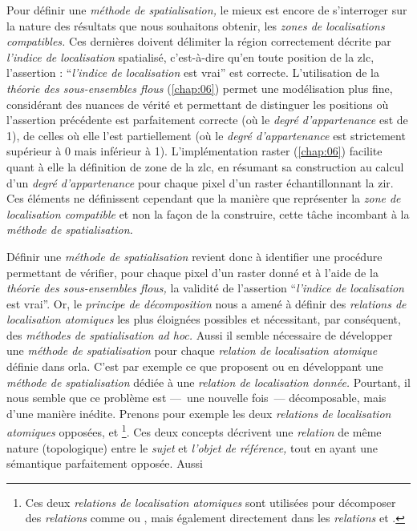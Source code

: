 Pour définir une \emph{méthode de spatialisation,} le mieux est encore de s’interroger sur la nature des résultats que nous souhaitons obtenir, les \emph{zones de localisations compatibles.} Ces dernières doivent délimiter la région correctement décrite par \emph{l'indice de localisation} spatialisé, c'est-à-dire qu'en toute position de la \ac{zlc}, l'assertion : \enquote{\emph{l'indice de localisation} est vrai} est correcte. L'utilisation de la \emph{théorie des sous-ensembles flous} (\autoref{chap:06}) permet une modélisation plus fine, considérant des nuances de vérité et permettant de distinguer les positions où l'assertion précédente est parfaitement correcte (\ie où le \emph{degré d'appartenance} est de 1), de celles où elle l'est partiellement (\ie où le \emph{degré d'appartenance} est strictement supérieur à 0 mais inférieur à 1). L'implémentation raster (\autoref{chap:06}) facilite quant à elle la définition de zone de la \ac{zlc}, en résumant sa construction au calcul d'un \emph{degré d'appartenance} pour chaque pixel d'un raster échantillonnant la \ac{zir}. Ces éléments ne définissent cependant que la manière que représenter la \emph{zone de localisation compatible} et non la façon de la construire, cette tâche incombant à la \emph{méthode de spatialisation.}

Définir une \emph{méthode de spatialisation} revient donc à identifier une procédure permettant de vérifier, pour chaque pixel d'un raster donné et à l'aide de la \emph{théorie des sous-ensembles flous,} la validité de l'assertion \enquote{\emph{l'indice de localisation} est vrai}. Or, le \emph{principe de décomposition} nous a amené à définir des \emph{relations de localisation atomiques} les plus éloignées possibles et nécessitant, par conséquent, des \emph{méthodes de spatialisation ad hoc.} Aussi il semble nécessaire de développer une \emph{méthode de spatialisation} pour chaque \emph{relation de localisation atomique} définie dans \ac{orla}. C'est par exemple ce que proposent \textcite{Vanegas2011} ou \textcite{Takemura2012} en développant une \emph{méthode de spatialisation} dédiée à une \emph{relation de localisation donnée.} Pourtant, il nous semble que ce problème est ---~une nouvelle fois~--- décomposable, mais d'une manière inédite. Prenons pour exemple les deux \emph{relations de localisation atomiques} opposées,  et  \footnote{Ces deux \emph{relations de localisation atomiques} sont utilisées pour décomposer des \emph{relations} comme \protect{} ou \protect{}, mais également directement dans les \emph{relations} \protect{} et \protect{}.}. Ces deux concepts décrivent une \emph{relation} de même nature (\ie topologique) entre le \emph{sujet} et \emph{l'objet de référence,} tout en ayant une sémantique parfaitement opposée. Aussi 

